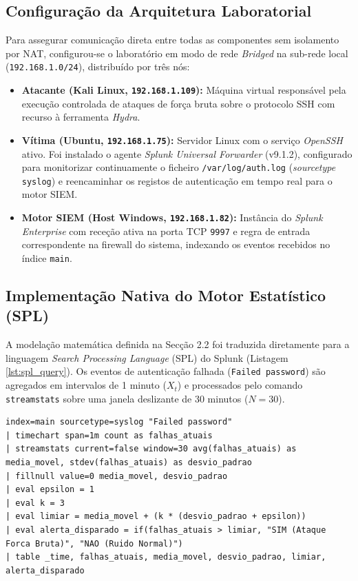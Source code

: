 \documentclass[12pt,a4paper]{article}
\begin{document}
\subsection{Configuração da Arquitetura Laboratorial}
Para assegurar comunicação direta entre todas as componentes sem isolamento por NAT, configurou-se o laboratório em modo de rede \textit{Bridged} na sub-rede local (\texttt{192.168.1.0/24}), distribuído por três nós:

\begin{itemize}
    \item \textbf{Atacante (Kali Linux, \texttt{192.168.1.109}):} Máquina virtual responsável pela execução controlada de ataques de força bruta sobre o protocolo SSH com recurso à ferramenta \textit{Hydra}.
    \item \textbf{Vítima (Ubuntu, \texttt{192.168.1.75}):} Servidor Linux com o serviço \textit{OpenSSH} ativo. Foi instalado o agente \textit{Splunk Universal Forwarder} (v9.1.2), configurado para monitorizar continuamente o ficheiro \texttt{/var/log/auth.log} (\textit{sourcetype} \texttt{syslog}) e reencaminhar os registos de autenticação em tempo real para o motor SIEM.
    \item \textbf{Motor SIEM (Host Windows, \texttt{192.168.1.82}):} Instância do \textit{Splunk Enterprise} com receção ativa na porta TCP \texttt{9997} e regra de entrada correspondente na firewall do sistema, indexando os eventos recebidos no índice \texttt{main}.
\end{itemize}

\subsection{Implementação Nativa do Motor Estatístico (SPL)}
A modelação matemática definida na Secção 2.2 foi traduzida diretamente para a linguagem \textit{Search Processing Language} (SPL) do Splunk (Listagem \ref{lst:spl_query}). Os eventos de autenticação falhada (\texttt{Failed password}) são agregados em intervalos de 1 minuto ($X_t$) e processados pelo comando \texttt{streamstats} sobre uma janela deslizante de 30 minutos ($N = 30$).

\begin{lstlisting}[caption={Regra de deteção estatística adaptativa implementada em Splunk SPL.}, label={lst:spl_query}]
index=main sourcetype=syslog "Failed password"
| timechart span=1m count as falhas_atuais
| streamstats current=false window=30 avg(falhas_atuais) as media_movel, stdev(falhas_atuais) as desvio_padrao
| fillnull value=0 media_movel, desvio_padrao
| eval epsilon = 1
| eval k = 3
| eval limiar = media_movel + (k * (desvio_padrao + epsilon))
| eval alerta_disparado = if(falhas_atuais > limiar, "SIM (Ataque Forca Bruta)", "NAO (Ruido Normal)")
| table _time, falhas_atuais, media_movel, desvio_padrao, limiar, alerta_disparado
\end{lstlisting}
\end{document}
